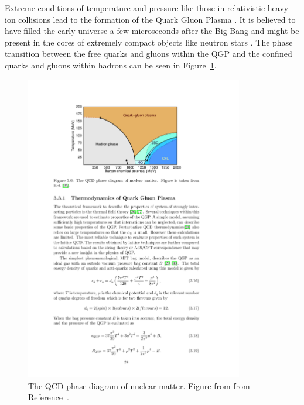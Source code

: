 Extreme conditions of temperature and pressure like those in relativistic heavy ion collisions lead to the formation of the Quark Gluon Plasma \cite{SHURYAK198071}. It is believed to have filled the early universe a few microseconds after the Big Bang and might be present in the cores of extremely compact objects like neutron stars \cite{PhysRevLett.34.1353, Linde_1979}. The phase transition between the free quarks and gluons within the QGP and the confined quarks and gluons within hadrons can be seen in Figure~\ref{fig:qcd_phase}.  

\begin{figure}[htbp]
\begin{center}
\includegraphics[width=0.85\textwidth]{figures/theory/qcd_phase}
\caption{The QCD phase diagram of nuclear matter. Figure from from Reference~\cite{PhysRevD.72.034004}. }
\label{fig:qcd_phase}
\end{center}
\end{figure}

